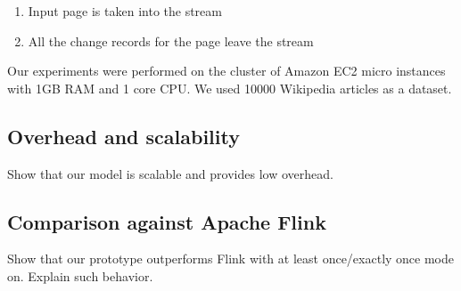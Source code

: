 \begin{enumerate}
    \item Input page is taken into the stream
    \item All the change records for the page leave the stream
\end{enumerate}

Our experiments were performed on the cluster of Amazon EC2 micro instances with 1GB RAM and 1 core CPU. We used 10000 Wikipedia articles as a dataset. 

\subsection{Overhead and scalability}
Show that our model is scalable and provides low overhead.

\subsection{Comparison against Apache Flink}
Show that our prototype outperforms Flink with at least once/exactly once mode on. Explain such behavior.

